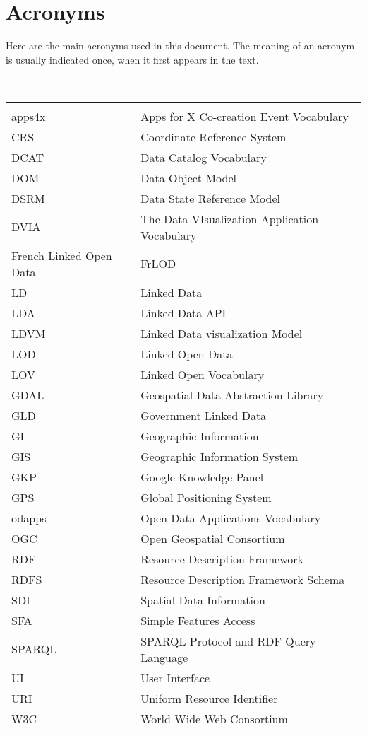 

\chapter*{Acronyms}

Here are the main acronyms used in this document. The meaning of an acronym is usually indicated once, when it first appears in the text. 

 \\

\begin{longtable}{lp{11cm}}
  &\\
  apps4x	 & Apps for X Co-creation Event Vocabulary\\
  CRS &  Coordinate Reference System\\
  
  DCAT & Data Catalog Vocabulary\\
  DOM  & Data Object Model \\
  DSRM & Data State Reference Model \\
  DVIA & The Data VIsualization Application Vocabulary\\
  
  French Linked Open Data & FrLOD \\
  LD  &  Linked Data\\
  LDA &  Linked Data API \\
  LDVM & Linked Data visualization Model \\
  LOD &  Linked Open Data\\ 
  
  
  LOV &  Linked Open Vocabulary\\
  
  GDAL& Geospatial Data Abstraction Library \\
  GLD &  Government Linked Data\\
  GI  &  Geographic Information\\
  GIS &  Geographic Information System\\
  GKP &  Google Knowledge Panel \\
  GPS &  Global Positioning System \\
  
  odapps	 & Open Data Applications Vocabulary\\
  OGC &  Open Geospatial Consortium\\
  
  RDF &  Resource Description Framework\\
  RDFS & Resource Description Framework Schema\\
  SDI  & Spatial Data Information\\
  SFA & Simple Features Access \\
  SPARQL	 & SPARQL Protocol and RDF Query Language\\
  UI  & User Interface \\
  URI &	Uniform Resource Identifier\\
  
  W3C & World Wide Web Consortium \\
  







  
  
 
\end{longtable}
